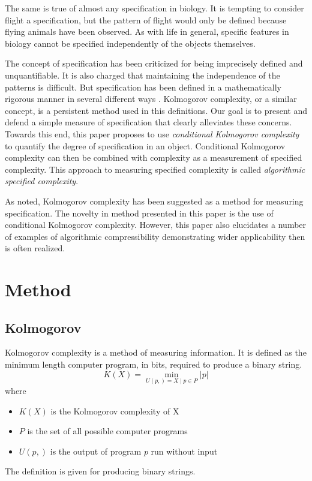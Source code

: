 The same is true of almost any specification in biology.
It is tempting to consider flight a specification, but the pattern of flight would only be defined because flying animals have been observed.
As with life in general, specific features in biology cannot be specified independently of the objects themselves.

The concept of specification has been criticized for being imprecisely defined and unquantifiable.
It is also charged that maintaining the independence of the patterns is difficult.
But specification has been defined in a mathematically rigorous manner in several different ways \citep{Dembski1998, Dembski2002, Dembski2005a}.
Kolmogorov complexity, or a similar concept, is a persistent method used in this definitions.
Our goal is to present and defend a simple measure of specification that clearly alleviates these concerns.
Towards this end, this paper proposes to use \textit{conditional Kolmogorov complexity} to quantify the degree of specification in an object.
Conditional Kolmogorov complexity can then be combined with complexity as a measurement of specified complexity. This approach to measuring specified complexity is called \textit{algorithmic specified complexity}.

As noted, Kolmogorov complexity has been suggested as a method for measuring specification.
The novelty in method presented in this paper is the use of conditional Kolmogorov complexity.
However, this paper also elucidates a number of examples of algorithmic compressibility demonstrating wider applicability then is often realized.

\section{Method}

\subsection{Kolmogorov}

Kolmogorov complexity is a method of measuring information.
It is defined as the minimum length computer program, in bits, required to produce a binary string.
\begin{equation}
    K(X) = \min_{U(p,) = X \mid p \in P} |p|
\end{equation} where
\begin{itemize}
    \item $K(X)$ is the Kolmogorov complexity of X
    \item $P$ is the set of all possible computer programs
    \item $U(p,)$ is the output of program $p$ run without input
\end{itemize}
The definition is given for producing binary strings.

